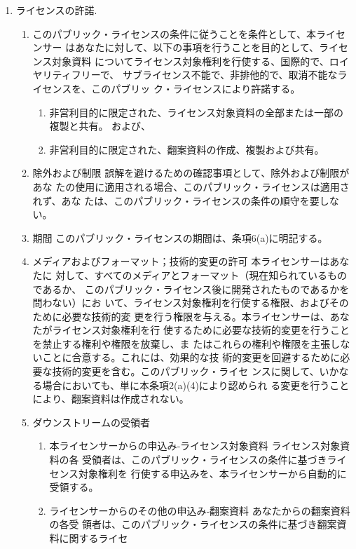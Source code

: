 {\begin{enumerate}
\renewcommand{\labelenumi}{\alph{enumi}.}
\renewcommand{\labelenumii}{\arabic{enumii}.}
\renewcommand{\labelenumiii}{\Alph{enumiii}.}
\item ライセンスの許諾.
\begin{enumerate}
\item このパブリック・ライセンスの条件に従うことを条件として、本ライセンサー
はあなたに対して、以下の事項を行うことを目的として、ライセンス対象資料
についてライセンス対象権利を行使する、国際的で、ロイヤリティフリーで、
サブライセンス不能で、非排他的で、取消不能なライセンスを、このパブリッ
ク・ライセンスにより許諾する。
\begin{enumerate}
\item 非営利目的に限定された、ライセンス対象資料の全部または一部の複製と共有。
および、
\item 非営利目的に限定された、翻案資料の作成、複製および共有。
\end{enumerate}
\item 除外および制限 誤解を避けるための確認事項として、除外および制限があな
たの使用に適用される場合、このパブリック・ライセンスは適用されず、あな
たは、このパブリック・ライセンスの条件の順守を要しない。
\item 期間 このパブリック・ライセンスの期間は、条項6(a)に明記する。
\item メディアおよびフォーマット；技術的変更の許可 本ライセンサーはあなたに
対して、すべてのメディアとフォーマット（現在知られているものであるか、
  このパブリック・ライセンス後に開発されたものであるかを問わない）にお
いて、ライセンス対象権利を行使する権限、およびそのために必要な技術的変
更を行う権限を与える。本ライセンサーは、あなたがライセンス対象権利を行
使するために必要な技術的変更を行うことを禁止する権利や権限を放棄し、ま
たはこれらの権利や権限を主張しないことに合意する。これには、効果的な技
術的変更を回避するために必要な技術的変更を含む。このパブリック・ライセ
ンスに関して、いかなる場合においても、単に本条項2(a)(4)により認められ
る変更を行うことにより、翻案資料は作成されない。
\item ダウンストリームの受領者
\begin{enumerate}
\item 本ライセンサーからの申込み‐ライセンス対象資料 ライセンス対象資料の各
受領者は、このパブリック・ライセンスの条件に基づきライセンス対象権利を
行使する申込みを、本ライセンサーから自動的に受領する。
\item ライセンサーからのその他の申込み‐翻案資料 あなたからの翻案資料の各受
領者は、このパブリック・ライセンスの条件に基づき翻案資料に関するライセ

\end{enumerate}
\end{enumerate}
\end{enumerate}}
